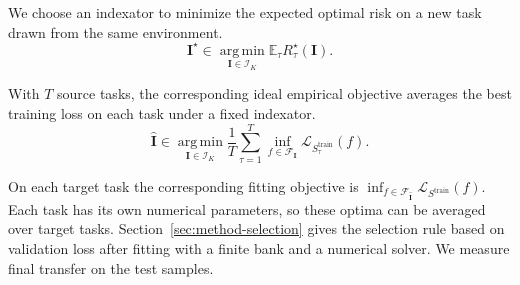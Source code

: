 We choose an indexator to minimize the expected optimal risk on a
new task drawn from the same environment.
\begin{equation}
    \mathbf I^\star
    \in\operatorname*{arg\,min}_{\mathbf I\in\mathcal I_K}
    \mathbb E_\tau R_\tau^\star(\mathbf I).
    \label{eq:optimal-structure}
\end{equation}

With $T$ source tasks, the corresponding ideal empirical objective
averages the best training loss on each task under a fixed indexator.
\begin{equation}
    \widehat{\mathbf I}\in\operatorname*{arg\,min}_{\mathbf I\in\mathcal I_K}
        \frac1T\sum_{\tau=1}^T
        \inf_{f\in\mathcal F_{\mathbf I}}\mathcal L_{S_\tau^{\mathrm{train}}}(f).
    \label{eq:structure-learning}
\end{equation}

On each target task the corresponding fitting objective is
$\inf_{f\in\mathcal F_{\widehat{\mathbf I}}}\mathcal L_{S^{\mathrm{train}}}(f)$.
Each task has its own numerical parameters, so these optima can be
averaged over target tasks. Section~\ref{sec:method-selection} gives
the selection rule based on validation loss after fitting with a
finite bank and a numerical solver. We measure final transfer on the
test samples.
